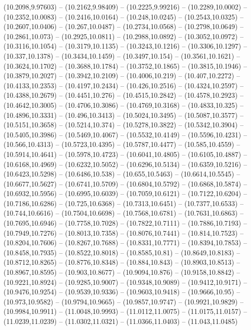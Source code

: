 {(10.2098,9.97603) -- (10.2162,9.98409) -- (10.2225,9.99216) -- (10.2289,10.0002) -- (10.2352,10.0083) -- (10.2416,10.0164) -- (10.248,10.0245) -- (10.2543,10.0325) -- (10.2607,10.0406) -- (10.267,10.0487) -- (10.2734,10.0568) -- (10.2798,10.0649) --
(10.2861,10.073) -- (10.2925,10.0811) -- (10.2988,10.0892) -- (10.3052,10.0972) -- (10.3116,10.1054) -- (10.3179,10.1135) -- (10.3243,10.1216) -- (10.3306,10.1297) -- (10.337,10.1378) -- (10.3434,10.1459) -- (10.3497,10.154) -- (10.3561,10.1621) --
(10.3624,10.1702) -- (10.3688,10.1784) -- (10.3752,10.1865) -- (10.3815,10.1946) -- (10.3879,10.2027) -- (10.3942,10.2109) -- (10.4006,10.219) -- (10.407,10.2272) -- (10.4133,10.2353) -- (10.4197,10.2434) -- (10.426,10.2516) -- (10.4324,10.2597) --
(10.4388,10.2679) -- (10.4451,10.276) -- (10.4515,10.2842) -- (10.4578,10.2923) -- (10.4642,10.3005) -- (10.4706,10.3086) -- (10.4769,10.3168) -- (10.4833,10.325) -- (10.4896,10.3331) -- (10.496,10.3413) -- (10.5024,10.3495) -- (10.5087,10.3577) --
(10.5151,10.3658) -- (10.5214,10.374) -- (10.5278,10.3822) -- (10.5342,10.3904) -- (10.5405,10.3986) -- (10.5469,10.4067) -- (10.5532,10.4149) -- (10.5596,10.4231) -- (10.566,10.4313) -- (10.5723,10.4395) -- (10.5787,10.4477) -- (10.585,10.4559) --
(10.5914,10.4641) -- (10.5978,10.4723) -- (10.6041,10.4805) -- (10.6105,10.4887) -- (10.6168,10.4969) -- (10.6232,10.5052) -- (10.6296,10.5134) -- (10.6359,10.5216) -- (10.6423,10.5298) -- (10.6486,10.538) -- (10.655,10.5463) -- (10.6614,10.5545) --
(10.6677,10.5627) -- (10.6741,10.5709) -- (10.6804,10.5792) -- (10.6868,10.5874) -- (10.6932,10.5956) -- (10.6995,10.6039) -- (10.7059,10.6121) -- (10.7122,10.6204) -- (10.7186,10.6286) -- (10.725,10.6368) -- (10.7313,10.6451) -- (10.7377,10.6533)
-- (10.744,10.6616) -- (10.7504,10.6698) -- (10.7568,10.6781) -- (10.7631,10.6863) -- (10.7695,10.6946) -- (10.7758,10.7028) -- (10.7822,10.7111) -- (10.7886,10.7193) -- (10.7949,10.7276) -- (10.8013,10.7358) -- (10.8076,10.7441) -- (10.814,10.7523)
-- (10.8204,10.7606) -- (10.8267,10.7688) -- (10.8331,10.7771) -- (10.8394,10.7853) -- (10.8458,10.7935) -- (10.8522,10.8018) -- (10.8585,10.81) -- (10.8649,10.8183) -- (10.8712,10.8265) -- (10.8776,10.8348) -- (10.884,10.843) -- (10.8903,10.8513)
-- (10.8967,10.8595) -- (10.903,10.8677) -- (10.9094,10.876) -- (10.9158,10.8842) -- (10.9221,10.8924) -- (10.9285,10.9007) -- (10.9348,10.9089) -- (10.9412,10.9171) -- (10.9476,10.9254) -- (10.9539,10.9336) -- (10.9603,10.9418) -- (10.9666,10.95)
-- (10.973,10.9582) -- (10.9794,10.9665) -- (10.9857,10.9747) -- (10.9921,10.9829) -- (10.9984,10.9911) -- (11.0048,10.9993) -- (11.0112,11.0075) -- (11.0175,11.0157) -- (11.0239,11.0239) -- (11.0302,11.0321) -- (11.0366,11.0403) -- (11.043,11.0485)
}
